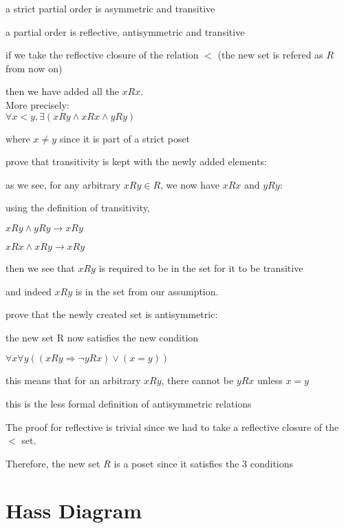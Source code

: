 \documentclass[12pts,A4]{article}
\begin{document}
\begin{flushleft}

    a strict partial order is asymmetric and transitive

    a partial order is reflective, antisymmetric and transitive

    \bigskip


    if we take the reflective closure of the relation $ < $ 
    (the new set is refered as $R$ from now on)

    then we have added all the $xRx$.\\

    More precisely: \\
    $ \forall x<y  , \exists (xRy \wedge xRx \wedge yRy)$

    where $ x \not = y$ since it is part of a strict poset 


    prove that transitivity is kept with the newly added elements:
    \bigskip

    as we see, for any arbitrary $xRy \in R$, we now have $xRx$ and $yRy$:

    using the definition of transitivity,
    
    $xRy \wedge yRy \rightarrow xRy$

    $xRx \wedge xRy \rightarrow xRy$
    
    then we see that $xRy$ is required to be in the set for it to be transitive

    and indeed $xRy$ is in the set from our assumption.
    \bigskip

    prove that the newly created set is antisymmetric:

    the new set R now satisfies the new condition 

    $ \forall x \forall y ((xRy \Rightarrow \neg yRx) \vee (x = y))$
    
    this means that for an arbitrary $xRy$, 
    there cannot be $yRx$ unless $ x = y$

    this is the less formal definition of antisymmetric relations
    
    \bigskip
    The proof for reflective is trivial since we had to take a reflective closure of the $<$ set.
    \bigskip

    Therefore, the new set $R$ is a poset since it satisfies the 3 conditions


    
\end{flushleft}

\section{Hass Diagram}
\end{document}
